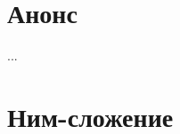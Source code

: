 \documentclass[12pt]{article}
\theoremstyle{definition}
\begin{document}
\tableofcontents{}

\section*{Анонс}
...

\newpage
\setcounter{section}{0}

\section{Ним-сложение}

\newcommand{\nim}{
$\mathbb{Z}_{\geq 0}$ — целые неотрицательные числа.

$\oplus$ — ним-сложение: переводим число в двоичную систему счисления, складываем побитно без переноса (0+0=0, 1+0=1, 1+1=0), 
переводим обратно в исходную систему счисления. 

$\otimes$ — ним-умножение: переводим число в двоичную систему счисления, побитно умножаем, 
переводим в исходную систему счисления. 

}
\end{document}

